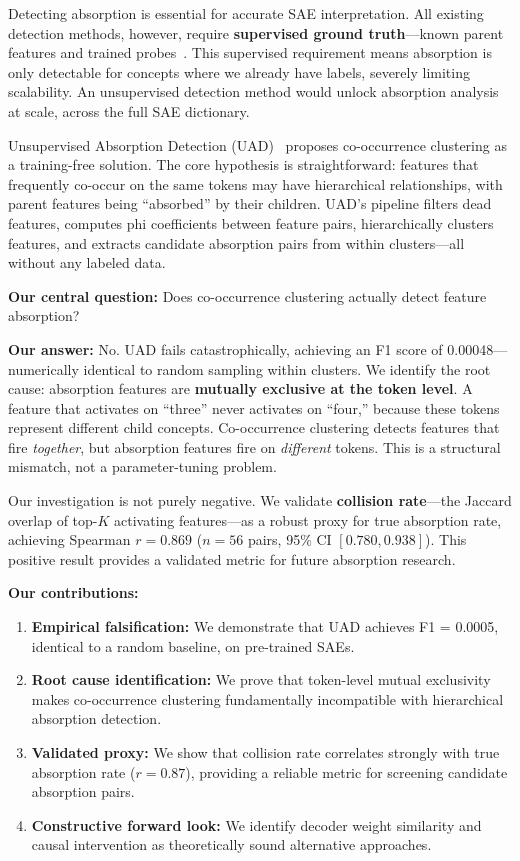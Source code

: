 \documentclass{article}
\begin{document}
Detecting absorption is essential for accurate SAE interpretation. All existing detection methods, however, require \textbf{supervised ground truth}---known parent features and trained probes~\citep{chanin2024absorption, karvonen2025causal}. This supervised requirement means absorption is only detectable for concepts where we already have labels, severely limiting scalability. An unsupervised detection method would unlock absorption analysis at scale, across the full SAE dictionary.

Unsupervised Absorption Detection (UAD)~\citep{chanin2024absorption} proposes co-occurrence clustering as a training-free solution. The core hypothesis is straightforward: features that frequently co-occur on the same tokens may have hierarchical relationships, with parent features being ``absorbed'' by their children. UAD's pipeline filters dead features, computes phi coefficients between feature pairs, hierarchically clusters features, and extracts candidate absorption pairs from within clusters---all without any labeled data.

\textbf{Our central question:} Does co-occurrence clustering actually detect feature absorption?

\textbf{Our answer:} No. UAD fails catastrophically, achieving an F1 score of 0.00048---numerically identical to random sampling within clusters. We identify the root cause: absorption features are \textbf{mutually exclusive at the token level}. A feature that activates on ``three'' never activates on ``four,'' because these tokens represent different child concepts. Co-occurrence clustering detects features that fire \emph{together}, but absorption features fire on \emph{different} tokens. This is a structural mismatch, not a parameter-tuning problem.

Our investigation is not purely negative. We validate \textbf{collision rate}---the Jaccard overlap of top-$K$ activating features---as a robust proxy for true absorption rate, achieving Spearman $r = 0.869$ ($n = 56$ pairs, 95\% CI $[0.780, 0.938]$). This positive result provides a validated metric for future absorption research.

\textbf{Our contributions:}
\begin{enumerate}
\item \textbf{Empirical falsification:} We demonstrate that UAD achieves F1 = 0.0005, identical to a random baseline, on pre-trained SAEs.
\item \textbf{Root cause identification:} We prove that token-level mutual exclusivity makes co-occurrence clustering fundamentally incompatible with hierarchical absorption detection.
\item \textbf{Validated proxy:} We show that collision rate correlates strongly with true absorption rate ($r = 0.87$), providing a reliable metric for screening candidate absorption pairs.
\item \textbf{Constructive forward look:} We identify decoder weight similarity and causal intervention as theoretically sound alternative approaches.
\end{enumerate}
\end{document}
